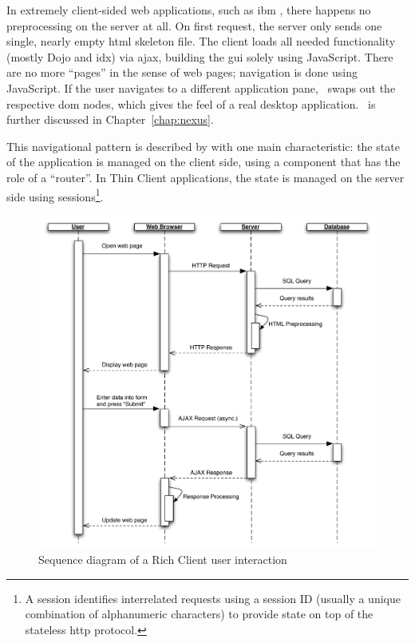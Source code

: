 In extremely client-sided web applications, such as \ac{ibm} \nexus, there happens no preprocessing on the server at all. On first request, the server only sends one single, nearly empty \ac{html} skeleton file. The client loads all needed functionality (mostly Dojo and \ac{idx}) via \ac{ajax}, building the \ac{gui} solely using JavaScript. There are no more ``pages'' in the sense of web pages; navigation is done using JavaScript. If the user navigates to a different application pane, \nexus\ swaps out the respective \ac{dom} nodes, which gives the feel of a real desktop application. \nexus\ is further discussed in Chapter~\ref{chap:nexus}.

This navigational pattern is described by  with one main characteristic: the state of the application is managed on the client side, using a component that has the role of a ``router''. In Thin Client applications, the state is managed on the server side using sessions\footnote{A \gls{session} identifies interrelated requests using a session ID (usually a unique combination of alphanumeric characters) to provide state on top of the stateless \ac{http} protocol.}.

\begin{figure}[H]
	\centering
	\includegraphics[width=16cm]{images/seqrichclient.pdf}
	\caption{Sequence diagram of a Rich Client user interaction}
	\label{fig:seqrichclient}
\end{figure}

